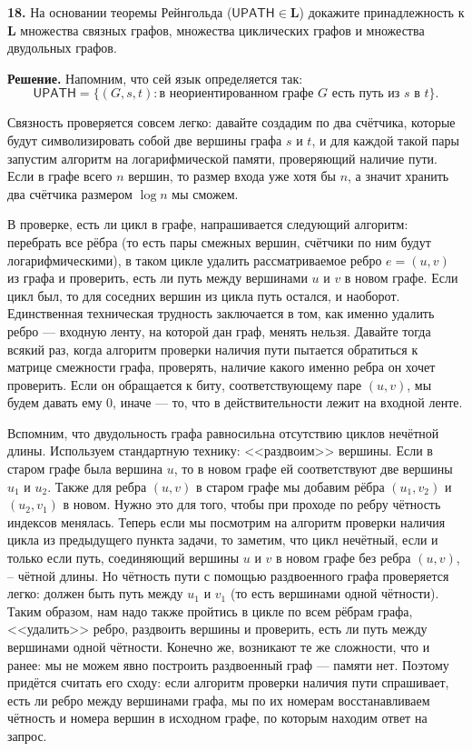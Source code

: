 \textbf{18.} На основании теоремы Рейнгольда ($\mathsf{UPATH} \in \mathbf{L}$) докажите принадлежность к $\mathbf{L}$ множества связных графов, множества циклических графов и множества двудольных графов.

\textbf{Решение.} Напомним, что сей язык определяется так:
\[
\mathsf{UPATH} = \{(G, s, t)\colon \text{в неориентированном графе $G$ есть путь из $s$ в $t$}\}.
\]

Связность проверяется совсем легко: давайте создадим по два счётчика, которые будут символизировать собой две вершины графа $s$ и $t$, и для каждой такой пары запустим алгоритм на логарифмической памяти, проверяющий наличие пути. Если в графе всего $n$ вершин, то размер входа уже хотя бы $n$, а значит хранить два счётчика размером $\log{n}$ мы сможем.

В проверке, есть ли цикл в графе, напрашивается следующий алгоритм: перебрать все рёбра (то есть пары смежных вершин, счётчики по ним будут логарифмическими), в таком цикле удалить рассматриваемое ребро $e = (u, v)$ из графа и проверить, есть ли путь между вершинами $u$ и $v$ в новом графе. Если цикл был, то для соседних вершин из цикла путь остался, и наоборот. Единственная техническая трудность заключается в том, как именно удалить ребро --- входную ленту, на которой дан граф, менять нельзя. Давайте тогда всякий раз, когда алгоритм проверки наличия пути пытается обратиться к матрице смежности графа, проверять, наличие какого именно ребра он хочет проверить. Если он обращается к биту, соответствующему паре $(u, v)$, мы будем давать ему 0, иначе --- то, что в действительности лежит на входной ленте.

Вспомним, что двудольность графа равносильна отсутствию циклов нечётной длины. Используем стандартную технику: <<раздвоим>> вершины. Если в старом графе была вершина $u$, то в новом графе ей соответствуют две вершины $u_1$ и $u_2$. Также для ребра $(u, v)$ в старом графе мы добавим рёбра $(u_1, v_2)$ и $(u_2, v_1)$ в новом. Нужно это для того, чтобы при проходе по ребру чётность индексов менялась. Теперь если мы посмотрим на алгоритм проверки наличия цикла из предыдущего пункта задачи, то заметим, что цикл нечётный, если и только если путь, соединяющий вершины $u$ и $v$ в новом графе без ребра $(u, v)$, -- чётной длины. Но чётность пути с помощью раздвоенного графа проверяется легко: должен быть путь между $u_1$ и $v_1$ (то есть вершинами одной чётности). Таким образом, нам надо также пройтись в цикле по всем рёбрам графа, <<удалить>> ребро, раздвоить вершины и проверить, есть ли путь между вершинами одной чётности. Конечно же, возникают те же сложности, что и ранее: мы не можем явно построить раздвоенный граф --- памяти нет. Поэтому придётся считать его сходу: если алгоритм проверки наличия пути спрашивает, есть ли ребро между вершинами графа, мы по их номерам восстанавливаем чётность и номера вершин в исходном графе, по которым находим ответ на запрос.